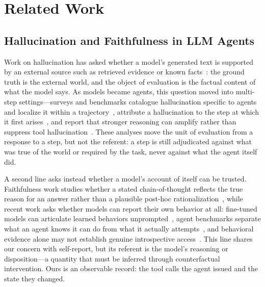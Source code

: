 \section{Related Work}
\label{sec: related_work}

\subsection{Hallucination and Faithfulness in LLM Agents}

Work on hallucination has asked whether a model's generated text is supported by
an external source such as retrieved evidence or known
facts~\citep{lin2022truthfulqa, min2023factscore, zhao2023felm}: the ground truth
is the external world, and the object of evaluation is the factual content of
what the model says. As models became agents, this question moved into
multi-step settings---surveys and benchmarks catalogue hallucination specific to
agents and localize it within a trajectory~\citep{agent_hallu_survey2025,
miragebench2025}, attribute a hallucination to the step at which it first
arises~\citep{liu2026agenthallu}, and report that stronger reasoning can amplify
rather than suppress tool hallucination~\citep{reasoning_trap2025}. These
analyses move the unit of evaluation from a response to a step, but not the
referent: a step is still adjudicated against what was true of the world or
required by the task, never against what the agent itself did.

A second line asks instead whether a model's account of itself can be trusted.
Faithfulness work studies whether a stated chain-of-thought reflects the true
reason for an answer rather than a plausible post-hoc
rationalization~\citep{turpin2023language, lanham2023measuring,
arcuschin2025wild, chen2025reasoning}, while recent work asks whether models can
report their own behavior at all: fine-tuned models can articulate learned
behaviors unprompted~\citep{betley2025tellme}, agent benchmarks separate what an
agent knows it can do from what it actually attempts~\citep{li2026kapro}, and
behavioral evidence alone may not establish genuine introspective
access~\citep{singh2026introspect}. This line shares our concern with
self-report, but its referent is the model's reasoning or disposition---a
quantity that must be inferred through counterfactual intervention. Ours is an
observable record: the tool calls the agent issued and the state they changed.

